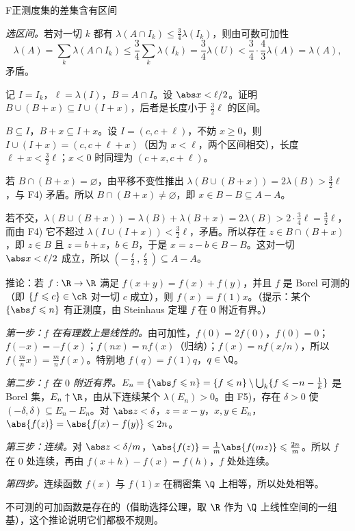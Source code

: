 \begin{probleme}{F}{正测度集的差集含有区间}
\begin{questions}
\begin{solution}
\emph{选区间。}若对一切 $k$ 都有 $\lambda(A\cap I_k)\leqslant\frac34\lambda(I_k)$，则由可数可加性
\[
\lambda(A)=\sum_k\lambda(A\cap I_k)\leqslant\frac34\sum_k\lambda(I_k)=\frac34\lambda(U)<\frac34\cdot\frac43\lambda(A)=\lambda(A),
\]
矛盾。
\end{solution}
\item 记 $I=I_k$，$\ell=\lambda(I)$，$B=A\cap I$。设 $\abs x<\ell/2$。证明 $B\cup(B+x)\subseteq I\cup(I+x)$，后者是长度小于 $\frac32\ell$ 的区间。
\begin{solution}
$B\subseteq I$，$B+x\subseteq I+x$。设 $I=(c,c+\ell)$，不妨 $x\geqslant0$，则 $I\cup(I+x)=(c,c+\ell+x)$（因为 $x<\ell$，两个区间相交），长度 $\ell+x<\frac32\ell$；$x<0$ 时同理为 $(c+x,c+\ell)$。
\end{solution}
\item 若 $B\cap(B+x)=\varnothing$，由平移不变性推出 $\lambda(B\cup(B+x))=2\lambda(B)>\frac32\ell$，与 F4) 矛盾。所以 $B\cap(B+x)\neq\varnothing$，即 $x\in B-B\subseteq A-A$。
\begin{solution}
若不交，$\lambda(B\cup(B+x))=\lambda(B)+\lambda(B+x)=2\lambda(B)>2\cdot\frac34\ell=\frac32\ell$，而由 F4) 它不超过 $\lambda(I\cup(I+x))<\frac32\ell$，矛盾。所以存在 $z\in B\cap(B+x)$，即 $z\in B$ 且 $z=b+x$，$b\in B$，于是 $x=z-b\in B-B$。这对一切 $\abs x<\ell/2$ 成立，所以 $(-\frac\ell2,\frac\ell2)\subseteq A-A$。
\end{solution}
\item 推论：若 $f:\R\to\R$ 满足 $f(x+y)=f(x)+f(y)$，并且 $f$ 是 Borel 可测的（即 $\{f\leqslant c\}\in\cR$ 对一切 $c$ 成立），则 $f(x)=f(1)x$。（提示：某个 $\{\abs f\leqslant n\}$ 有正测度，由 Steinhaus 定理 $f$ 在 $0$ 附近有界。）
\begin{solution}
\emph{第一步：$f$ 在有理数上是线性的。}由可加性，$f(0)=2f(0)$，$f(0)=0$；$f(-x)=-f(x)$；$f(nx)=nf(x)$（归纳）；$f(x)=nf(x/n)$，所以 $f(\frac mnx)=\frac mnf(x)$。特别地 $f(q)=f(1)q$，$q\in\Q$。

\emph{第二步：$f$ 在 $0$ 附近有界。}$E_n=\{\abs f\leqslant n\}=\{f\leqslant n\}\setminus\bigcup_k\{f\leqslant-n-\frac1k\}$ 是 Borel 集，$E_n\uparrow\R$，由从下连续某个 $\lambda(E_n)>0$。由 F5)，存在 $\delta>0$ 使 $(-\delta,\delta)\subseteq E_n-E_n$。对 $\abs z<\delta$，$z=x-y$，$x,y\in E_n$，$\abs{f(z)}=\abs{f(x)-f(y)}\leqslant2n$。

\emph{第三步：连续。}对 $\abs z<\delta/m$，$\abs{f(z)}=\frac1m\abs{f(mz)}\leqslant\frac{2n}m$。所以 $f$ 在 $0$ 处连续，再由 $f(x+h)-f(x)=f(h)$，$f$ 处处连续。

\emph{第四步。}连续函数 $f(x)$ 与 $f(1)x$ 在稠密集 $\Q$ 上相等，所以处处相等。

不可测的可加函数是存在的（借助选择公理，取 $\R$ 作为 $\Q$ 上线性空间的一组基），这个推论说明它们都极不规则。
\end{solution}
\end{questions}
\end{probleme}
